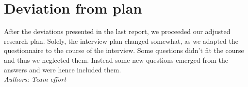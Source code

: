 \documentclass[sigchi-a, authorversion]{acmart}
\begin{document}
\section{Deviation from plan}
\label{deviation_from_plan}
After the deviations presented in the last report, we proceeded our adjusted research plan. Solely, the interview plan changed somewhat, as we adapted the questionnaire to the course of the interview. Some questions didn't fit the course and thus we neglected them. Instead some new questions emerged from the answers and were hence included them. \\
\textit{Authors: Team effort}\\



\end{document}
